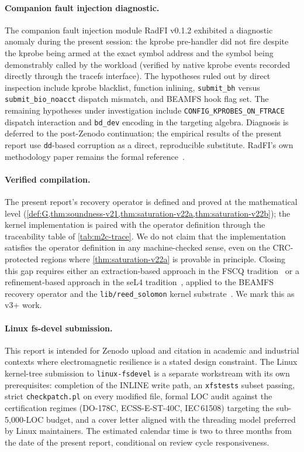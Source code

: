 \paragraph{Companion fault injection diagnostic.}
The companion fault injection module RadFI v0.1.2 exhibited a
diagnostic anomaly during the present session: the kprobe
pre-handler did not fire despite the kprobe being armed at the
exact symbol address and the symbol being demonstrably called by
the workload (verified by native kprobe events recorded directly
through the tracefs interface). The hypotheses ruled out by
direct inspection include kprobe blacklist, function inlining,
\texttt{submit\_bh} versus \texttt{submit\_bio\_noacct} dispatch
mismatch, and BEAMFS hook flag set. The remaining hypotheses
under investigation include
\texttt{CONFIG\_KPROBES\_ON\_FTRACE} dispatch interaction and
\texttt{bd\_dev} encoding in the targeting algebra. Diagnosis is
deferred to the post-Zenodo continuation; the empirical results
of the present report use \texttt{dd}-based corruption as a
direct, reproducible substitute. RadFI's own methodology paper
remains the formal reference~\cite{desbrieres2026radfi}.

\paragraph{Verified compilation.}
The present report's recovery operator is defined and proved at
the mathematical level (\cref{def:G,thm:soundness-v21,thm:saturation-v22a,thm:saturation-v22b});
the kernel implementation is paired with the operator definition
through the traceability table of \cref{tab:m2c-trace}. We do not
claim that the implementation satisfies the operator definition
in any machine-checked sense, even on the CRC-protected regions
where \cref{thm:saturation-v22a} is provable in principle. Closing this gap requires either an
extraction-based approach in the FSCQ
tradition~\cite{chen2015fscq} or a refinement-based approach in
the seL4 tradition~\cite{klein2009sel4}, applied to the BEAMFS
recovery operator and the \texttt{lib/reed\_solomon} kernel
substrate~\cite{kernelrslib}. We mark this as v3+ work.

\paragraph{Linux fs-devel submission.}
This report is intended for Zenodo upload and citation in
academic and industrial contexts where electromagnetic resilience
is a stated design constraint. The Linux kernel-tree submission
to \texttt{linux-fsdevel} is a separate workstream with its own
prerequisites: completion of the INLINE write path, an
\texttt{xfstests} subset passing, strict \texttt{checkpatch.pl}
on every modified file, formal LOC audit against the certification
regimes (DO-178C, ECSS-E-ST-40C, IEC\,61508) targeting the
sub-5{,}000-LOC budget, and a cover letter aligned with the
threading model preferred by Linux maintainers. The estimated
calendar time is two to three months from the date of the present
report, conditional on review cycle responsiveness.
